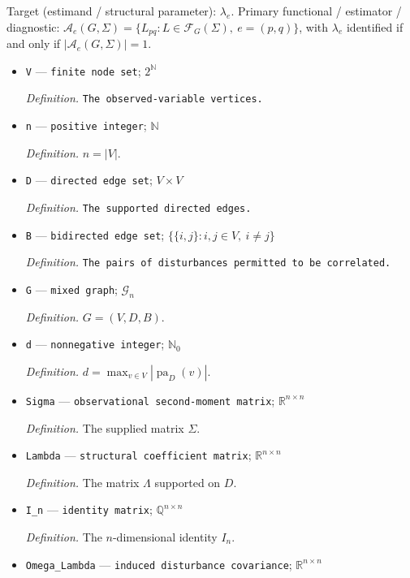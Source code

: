 \documentclass{article}
\begin{document}
Target (estimand / structural parameter): \(\lambda_e\).
Primary functional / estimator / diagnostic: \(\mathcal A_e(G,\Sigma)=\{L_{pq}:L\in\mathcal F_G(\Sigma),\ e=(p,q)\}\), with \(\lambda_e\) identified if and only if \(|\mathcal A_e(G,\Sigma)|=1\).
\begin{itemize}
  \item \texttt{V} --- \texttt{finite node set}; \(2^{\mathbb N}\)
  \par\smallskip\noindent\emph{Definition.} \texttt{The observed-\allowbreak{}variable vertices.}
  \item \texttt{n} --- \texttt{positive integer}; \(\mathbb N\)
  \par\smallskip\noindent\emph{Definition.} \(n=|V|\).
  \item \texttt{D} --- \texttt{directed edge set}; \(V\times V\)
  \par\smallskip\noindent\emph{Definition.} \texttt{The supported directed edges.}
  \item \texttt{B} --- \texttt{bidirected edge set}; \(\{\{i,j\}:i,j\in V,\ i\ne j\}\)
  \par\smallskip\noindent\emph{Definition.} \texttt{The pairs of disturbances permitted to be correlated.}
  \item \texttt{G} --- \texttt{mixed graph}; \(\mathcal G_n\)
  \par\smallskip\noindent\emph{Definition.} \(G=(V,D,B)\).
  \item \texttt{d} --- \texttt{nonnegative integer}; \(\mathbb N_0\)
  \par\smallskip\noindent\emph{Definition.} \(d=\max_{v\in V}|\operatorname{pa}_D(v)|\).
  \item \texttt{Sigma} --- \texttt{observational second-\allowbreak{}moment matrix}; \(\mathbb R^{n\times n}\)
  \par\smallskip\noindent\emph{Definition.} The supplied matrix \(\Sigma\).
  \item \texttt{Lambda} --- \texttt{structural coefficient matrix}; \(\mathbb R^{n\times n}\)
  \par\smallskip\noindent\emph{Definition.} The matrix \(\Lambda\) supported on \(D\).
  \item \texttt{I\_\allowbreak{}n} --- \texttt{identity matrix}; \(\mathbb Q^{n\times n}\)
  \par\smallskip\noindent\emph{Definition.} The \(n\)-dimensional identity \(I_n\).
  \item \texttt{Omega\_\allowbreak{}Lambda} --- \texttt{induced disturbance covariance}; \(\mathbb R^{n\times n}\)

\end{itemize}
\end{document}
